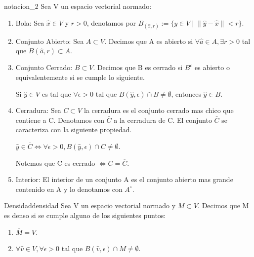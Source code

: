 \documentclass[12pt,a4paper]{book}
\providecommand{\norm}[1]{\lVert#1\rVert}
\begin{document}
\smallskip

\begin{notacion}{}{notacion_2}
Sea V un espacio vectorial normado:
\begin{enumerate}
\item Bola: Sea $\widehat{x}\in V$ y $r>0$, denotamos por $B_(\widehat{x},r):=\lbrace y\in V\;|\; \norm{\widehat{y}-\widehat{x}}<r \rbrace$.
\\
\item Conjunto Abierto: Sea $A\subset V$. Decimos que A es abierto si $\forall \widehat{a}\in A, \exists r>0$ tal que $B(\widehat{a},r)\subset A$. 
\item Conjunto Cerrado: $B\subset V$. Decimos que B es cerrado si $B^{c}$ es abierto o equivalentemente si se cumple lo siguiente.
\begin{center}
Si $\widehat{y}\in V$ es tal que $\forall\epsilon >0$ tal que $B(\widehat{y},\epsilon)\cap B\neq\emptyset$, entonces $\widehat{y}\in B$.
\end{center}
\item Cerradura: Sea $C\subset V$ la cerradura es el conjunto cerrado mas chico que contiene a C. Denotamos con $\bar{C}$ a la cerradura de C. El conjunto $\bar{C}$ se caracteriza con la siguiente propiedad.
\begin{center}
$\widehat{y}\in\overline{C}\Leftrightarrow \forall\epsilon >0, B(\widehat{y},\epsilon)\cap C\neq\emptyset$.
\end{center}
Notemos que C es cerrado $\Leftrightarrow C=\overline{C}$.
\item Interior: El interior de un conjunto A es el conjunto abierto mas grande contenido en A y lo denotamos con $A^{\circ}$.
\end{enumerate}
\end{notacion}

\smallskip

\begin{definicion}{Densidad}{densidad}
Sea V un espacio vectorial normado y $M\subset V$. Decimos que M es denso si se cumple alguno de los siguientes puntos:
\begin{enumerate}
\item $\overline{M}=V$.
\item $\forall \widehat{v}\in V, \forall\epsilon >0$ tal que $B(\widehat{v},\epsilon)\cap M\neq\emptyset$.
\end{enumerate}
\end{definicion}

\smallskip
\end{document}
